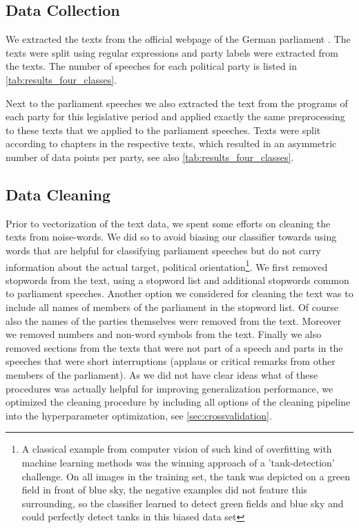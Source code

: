 \documentclass{article} %
\begin{document}
\subsection{Data Collection}\label{sec:collection}
We extracted the texts from the official webpage of the German parliament \cite{plenarprotokolle}. The texts were split using regular expressions and party labels were extracted from the texts. The number of speeches for each political party is listed in \autoref{tab:results_four_classes}. 

Next to the parliament speeches we also extracted the text from the programs of each party for this legislative period \cite{linke_parteiprogramm, gruene_parteiprogramm,spd_parteiprogramm, cdu_parteiprogramm} and applied exactly the same preprocessing to these texts that we applied to the parliament speeches. Texts were split according to chapters in the respective texts, which resulted in an asymmetric number of data points per party, see also \autoref{tab:results_four_classes}.


\subsection{Data Cleaning}\label{sec:cleaning}
Prior to vectorization of the text data, we spent some efforts on cleaning the texts from noise-words. We did so to avoid biasing our classifier towards using words that are helpful for classifying parliament speeches but do not carry information about the actual target, political orientation\footnote{A classical example from computer vision of such kind of overfitting with machine learning methods was the winning approach of a 'tank-detection' challenge. On all images in the training set, the tank was depicted on a green field in front of blue sky, the negative examples did not feature this surrounding, so the classifier learned to detect green fields and blue sky and could perfectly detect tanks in this biased data set}. We first removed stopwords from the text, using a stopword list \cite{stopwords} and additional stopwords common to parliament speeches. Another option we considered for cleaning the text was to include all names of members of the parliament in the stopword list. Of course also the names of the parties themselves were removed from the text. Moreover we removed numbers and non-word symbols from the text. Finally we also removed sections from the texts that were not part of a speech and parts in the speeches that were short interruptions (applaus or critical remarks from other members of the parliament). As we did not have clear ideas what of these procedures was actually helpful for improving generalization performance, we optimized the cleaning procedure by including all options of the cleaning pipeline into the hyperparameter optimization, see \autoref{sec:crossvalidation}. 
\end{document}
